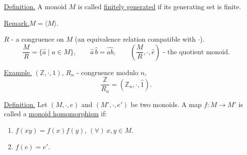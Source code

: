 \bigskip
\noindent\underline{Definition.}\quad
A monoid $M$ is called \underline{finitely generated}
if its generating set is finite.

\medskip
\noindent\underline{Remark.}\quad $M=\langle M\rangle$.

\bigskip
\noindent $R$ - a congruence on $M$
(an equivalence relation compatible with $\cdot$).
\[
\frac{M}{R}=\{\hat a\mid a\in M\},
\qquad \hat a\,\hat b=\widehat{ab},
\qquad \left(\frac{M}{R},\cdot,\hat e\right)
\text{ - the quotient monoid.}
\]

\bigskip
\noindent\underline{Example.}\quad
$(\mathbb{Z},\cdot,1)$, $R_n$ - congruence modulo $n$,
\[
\frac{\mathbb{Z}}{R_n}=(\mathbb{Z}_n,\cdot,\hat 1).
\]

\bigskip
\noindent\underline{Definition.}\quad
Let $(M,\cdot,e)$ and $(M',\cdot,e')$ be two monoids.
A map $f:M\to M'$ is called a \underline{monoid homomorphism} if:
\begin{enumerate}
\item[(1)] $f(xy)=f(x)f(y)$, $(\forall)\,x,y\in M$.
\item[(2)] $f(e)=e'$.
\end{enumerate}

